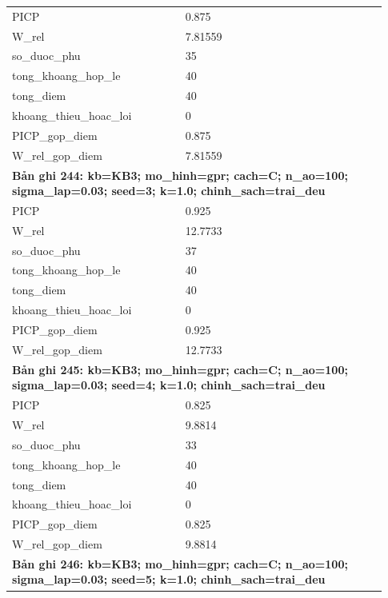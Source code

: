 \begin{longtable}{p{0.43\linewidth}p{0.50\linewidth}}
PICP & 0.875 \\
W\_\allowbreak rel & 7.81559 \\
so\_\allowbreak duoc\_\allowbreak phu & 35 \\
tong\_\allowbreak khoang\_\allowbreak hop\_\allowbreak le & 40 \\
tong\_\allowbreak diem & 40 \\
khoang\_\allowbreak thieu\_\allowbreak hoac\_\allowbreak loi & 0 \\
PICP\_\allowbreak gop\_\allowbreak diem & 0.875 \\
W\_\allowbreak rel\_\allowbreak gop\_\allowbreak diem & 7.81559 \\
\midrule
\multicolumn{2}{p{0.95\linewidth}}{\textbf{Bản ghi 244: kb=KB3; mo\_hinh=gpr; cach=C; n\_ao=100; sigma\_lap=0.03; seed=3; k=1.0; chinh\_sach=trai\_deu}} \\
PICP & 0.925 \\
W\_\allowbreak rel & 12.7733 \\
so\_\allowbreak duoc\_\allowbreak phu & 37 \\
tong\_\allowbreak khoang\_\allowbreak hop\_\allowbreak le & 40 \\
tong\_\allowbreak diem & 40 \\
khoang\_\allowbreak thieu\_\allowbreak hoac\_\allowbreak loi & 0 \\
PICP\_\allowbreak gop\_\allowbreak diem & 0.925 \\
W\_\allowbreak rel\_\allowbreak gop\_\allowbreak diem & 12.7733 \\
\midrule
\multicolumn{2}{p{0.95\linewidth}}{\textbf{Bản ghi 245: kb=KB3; mo\_hinh=gpr; cach=C; n\_ao=100; sigma\_lap=0.03; seed=4; k=1.0; chinh\_sach=trai\_deu}} \\
PICP & 0.825 \\
W\_\allowbreak rel & 9.8814 \\
so\_\allowbreak duoc\_\allowbreak phu & 33 \\
tong\_\allowbreak khoang\_\allowbreak hop\_\allowbreak le & 40 \\
tong\_\allowbreak diem & 40 \\
khoang\_\allowbreak thieu\_\allowbreak hoac\_\allowbreak loi & 0 \\
PICP\_\allowbreak gop\_\allowbreak diem & 0.825 \\
W\_\allowbreak rel\_\allowbreak gop\_\allowbreak diem & 9.8814 \\
\midrule
\multicolumn{2}{p{0.95\linewidth}}{\textbf{Bản ghi 246: kb=KB3; mo\_hinh=gpr; cach=C; n\_ao=100; sigma\_lap=0.03; seed=5; k=1.0; chinh\_sach=trai\_deu}} \\

\end{longtable}
